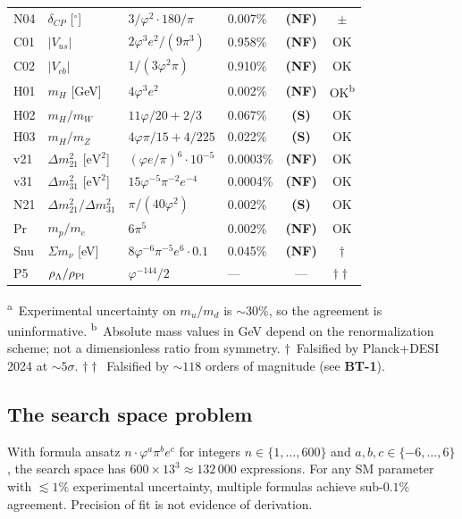 \documentclass[12pt,a4paper]{article}
\newcommand{\BT}[1]{\textbf{BT-#1}}
\newcommand{\Sclass}{\textbf{(S)}}
\newcommand{\NFclass}{\textbf{(NF)}}
\begin{document}
\begin{longtable}{llllcc}
  N04 & \(\delta_{CP}\) [\(^\circ\)] & \(3/\varphi^2 \cdot 180/\pi\) & 0.007\% & \NFclass & \(\pm\) \\
  C01 & \(|V_{us}|\) & \(2\varphi^3 e^2/(9\pi^3)\) & 0.958\% & \NFclass & OK \\
  C02 & \(|V_{cb}|\) & \(1/(3\varphi^2\pi)\) & 0.910\% & \NFclass & OK \\
  H01 & \(m_H\) [GeV] & \(4\varphi^3 e^2\) & 0.002\% & \NFclass & OK\textsuperscript{b} \\
  H02 & \(m_H/m_W\) & \(11\varphi/20 + 2/3\) & 0.067\% & \Sclass & OK \\
  H03 & \(m_H/m_Z\) & \(4\varphi\pi/15 + 4/225\) & 0.022\% & \Sclass & OK \\
  v21 & \(\Delta m^2_{21}\) [\(\mathrm{eV}^2\)] & \((\varphi e/\pi)^6\cdot10^{-5}\) & 0.0003\% & \NFclass & OK \\
  v31 & \(\Delta m^2_{31}\) [\(\mathrm{eV}^2\)] & \(15\varphi^{-5}\pi^{-2}e^{-4}\) & 0.0004\% & \NFclass & OK \\
  N21 & \(\Delta m^2_{21}/\Delta m^2_{31}\) & \(\pi/(40\varphi^2)\) & 0.002\% & \Sclass & OK \\
  Pr  & \(m_p/m_e\) & \(6\pi^5\) & 0.002\% & \NFclass & OK \\
  Snu & \(\Sigma m_\nu\) [eV] & \(8\varphi^{-6}\pi^{-5}e^6\cdot0.1\) & 0.045\% & \NFclass & \(\dagger\) \\
  P5  & \(\rho_\Lambda/\rho_{\rm Pl}\) & \(\varphi^{-144}/2\) & --- & --- & \(\dagger\dagger\) \\
\end{longtable}

\noindent\small\textsuperscript{a}~Experimental uncertainty on \(m_u/m_d\) is \(\sim30\%\),
so the agreement is uninformative.
\textsuperscript{b}~Absolute mass values in GeV depend on the renormalization scheme;
not a dimensionless ratio from symmetry.
\(\dagger\)~Falsified by Planck+DESI 2024 at \({\sim}5\sigma\).
\(\dagger\dagger\)~Falsified by \({\sim}118\) orders of magnitude (see \BT{1}).

\subsection{The search space problem}

With formula ansatz \(n \cdot \varphi^a \pi^b e^c\) for integers
\(n \in \{1,\ldots,600\}\) and \(a,b,c \in \{-6,\ldots,6\}\), the search space has
\(600 \times 13^3 \approx 132\,000\) expressions. For any SM parameter with
\(\lesssim 1\%\) experimental uncertainty, multiple formulas achieve
sub-\(0.1\%\) agreement. Precision of fit is not evidence of derivation.
\end{document}
